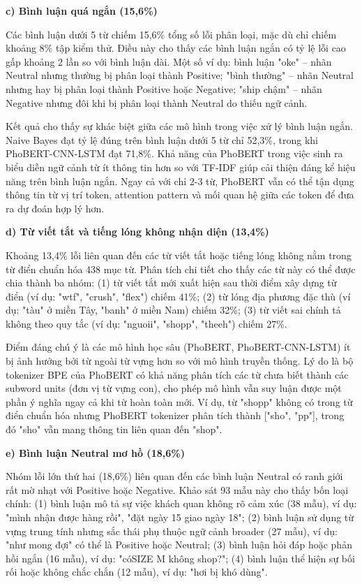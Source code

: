 \documentclass[14pt, a4paper]{report}
\begin{document}
\textbf{c) Bình luận quá ngắn (15,6\%)}


Các bình luận dưới 5 từ chiếm 15,6\% tổng số lỗi phân loại, mặc dù chỉ chiếm khoảng 8\% tập kiểm thử. Điều này cho thấy các bình luận ngắn có tỷ lệ lỗi cao gấp khoảng 2 lần so với bình luận dài. Một số ví dụ: bình luận "oke" – nhãn Neutral nhưng thường bị phân loại thành Positive; "bình thường" – nhãn Neutral nhưng hay bị phân loại thành Positive hoặc Negative; "ship chậm" – nhãn Negative nhưng đôi khi bị phân loại thành Neutral do thiếu ngữ cảnh.


Kết quả cho thấy sự khác biệt giữa các mô hình trong việc xử lý bình luận ngắn. Naive Bayes đạt tỷ lệ đúng trên bình luận dưới 5 từ chỉ 52,3\%, trong khi PhoBERT-CNN-LSTM đạt 71,8\%. Khả năng của PhoBERT trong việc sinh ra biểu diễn ngữ cảnh từ ít thông tin hơn so với TF-IDF giúp cải thiện đáng kể hiệu năng trên bình luận ngắn. Ngay cả với chỉ 2-3 từ, PhoBERT vẫn có thể tận dụng thông tin từ vị trí token, attention pattern và mối quan hệ giữa các token để đưa ra dự đoán hợp lý hơn.


\textbf{d) Từ viết tắt và tiếng lóng không nhận diện (13,4\%)}


Khoảng 13,4\% lỗi liên quan đến các từ viết tắt hoặc tiếng lóng không nằm trong từ điển chuẩn hóa 438 mục từ. Phân tích chi tiết cho thấy các từ này có thể được chia thành ba nhóm: (1) từ viết tắt mới xuất hiện sau thời điểm xây dựng từ điển (ví dụ: "wtf", "crush", "flex") chiếm 41\%; (2) từ lóng địa phương đặc thù (ví dụ: "tàu" ở miền Tây, "banh" ở miền Nam) chiếm 32\%; (3) từ viết sai chính tả không theo quy tắc (ví dụ: "nguoii", "shopp", "theeh") chiếm 27\%.


Điểm đáng chú ý là các mô hình học sâu (PhoBERT, PhoBERT-CNN-LSTM) ít bị ảnh hưởng bởi từ ngoài từ vựng hơn so với mô hình truyền thống. Lý do là bộ tokenizer BPE của PhoBERT có khả năng phân tích các từ chưa biết thành các subword units (đơn vị từ vựng con), cho phép mô hình vẫn suy luận được một phần ý nghĩa ngay cả khi từ hoàn toàn mới. Ví dụ, từ "shopp" không có trong từ điển chuẩn hóa nhưng PhoBERT tokenizer phân tích thành ["sho", "pp"], trong đó "sho" vẫn mang thông tin liên quan đến "shop".


\textbf{e) Bình luận Neutral mơ hồ (18,6\%)}


Nhóm lỗi lớn thứ hai (18,6\%) liên quan đến các bình luận Neutral có ranh giới rất mờ nhạt với Positive hoặc Negative. Khảo sát 93 mẫu này cho thấy bốn loại chính: (1) bình luận mô tả sự việc khách quan không rõ cảm xúc (38 mẫu), ví dụ: "mình nhận được hàng rồi", "đặt ngày 15 giao ngày 18"; (2) bình luận sử dụng từ vựng trung tính nhưng sắc thái phụ thuộc ngữ cảnh broader (27 mẫu), ví dụ: "như mong đợi" có thể là Positive hoặc Neutral; (3) bình luận hỏi đáp hoặc phản hồi ngắn (16 mẫu), ví dụ: "cóSIZE M không shop?"; (4) bình luận thể hiện sự bối rối hoặc không chắc chắn (12 mẫu), ví dụ: "hơi bị khó dùng".
\end{document}

